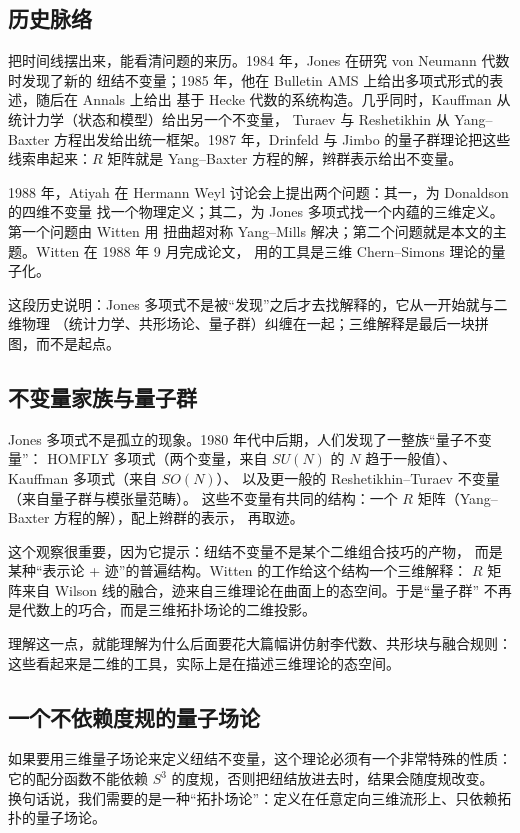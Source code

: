\subsection{历史脉络}

把时间线摆出来，能看清问题的来历。1984 年，Jones 在研究 von Neumann 代数时发现了新的
纽结不变量；1985 年，他在 Bulletin AMS 上给出多项式形式的表述，随后在 Annals 上给出
基于 Hecke 代数的系统构造。几乎同时，Kauffman 从统计力学（状态和模型）给出另一个不变量，
Turaev 与 Reshetikhin 从 Yang--Baxter 方程出发给出统一框架。1987 年，Drinfeld 与 Jimbo
的量子群理论把这些线索串起来：$R$ 矩阵就是 Yang--Baxter 方程的解，辫群表示给出不变量。

1988 年，Atiyah 在 Hermann Weyl 讨论会上提出两个问题：其一，为 Donaldson 的四维不变量
找一个物理定义；其二，为 Jones 多项式找一个内蕴的三维定义。第一个问题由 Witten 用
扭曲超对称 Yang--Mills 解决；第二个问题就是本文的主题。Witten 在 1988 年 9 月完成论文，
用的工具是三维 Chern--Simons 理论的量子化。

这段历史说明：Jones 多项式不是被“发现”之后才去找解释的，它从一开始就与二维物理
（统计力学、共形场论、量子群）纠缠在一起；三维解释是最后一块拼图，而不是起点。

\subsection{不变量家族与量子群}

Jones 多项式不是孤立的现象。1980 年代中后期，人们发现了一整族“量子不变量”：
HOMFLY 多项式（两个变量，来自 $SU(N)$ 的 $N$ 趋于一般值）、Kauffman 多项式（来自 $SO(N)$）、
以及更一般的 Reshetikhin--Turaev 不变量（来自量子群与模张量范畴）。
这些不变量有共同的结构：一个 $R$ 矩阵（Yang--Baxter 方程的解），配上辫群的表示，
再取迹。

这个观察很重要，因为它提示：纽结不变量不是某个二维组合技巧的产物，
而是某种“表示论 + 迹”的普遍结构。Witten 的工作给这个结构一个三维解释：
$R$ 矩阵来自 Wilson 线的融合，迹来自三维理论在曲面上的态空间。于是“量子群”
不再是代数上的巧合，而是三维拓扑场论的二维投影。

理解这一点，就能理解为什么后面要花大篇幅讲仿射李代数、共形块与融合规则：
这些看起来是二维的工具，实际上是在描述三维理论的态空间。

\subsection{一个不依赖度规的量子场论}

如果要用三维量子场论来定义纽结不变量，这个理论必须有一个非常特殊的性质：
它的配分函数不能依赖 $S^3$ 的度规，否则把纽结放进去时，结果会随度规改变。
换句话说，我们需要的是一种“拓扑场论”：定义在任意定向三维流形上、只依赖拓扑的量子场论。

